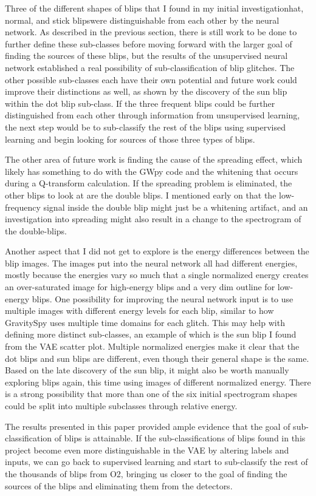 \documentclass[a4paper]{article}
\begin{document}
Three of the different shapes of blips that I found in my initial investigation\textemdash hat, normal, and stick blips\textemdash were distinguishable from each other by the neural network. As described in the previous section, there is still work to be done to further define these sub-classes before moving forward with the larger goal of finding the sources of these blips, but the results of the unsupervised neural network established a real possibility of sub-classification of blip glitches. The other possible sub-classes each have their own potential and future work could improve their distinctions as well, as shown by the discovery of the sun blip within the dot blip sub-class. If the three frequent blips could be further distinguished from each other through information from unsupervised learning, the next step would be to sub-classify the rest of the blips using supervised learning and begin looking for sources of those three types of blips. 

The other area of future work is finding the cause of the spreading effect, which likely has something to do with the GWpy code and the whitening that occurs during a Q-transform calculation. If the spreading problem is eliminated, the other blips to look at are the double blips. I mentioned early on that the low-frequency signal inside the double blip might just be a whitening artifact, and an investigation into spreading might also result in a change to the spectrogram of the double-blips.

Another aspect that I did not get to explore is the energy differences between the blip images. The images put into the neural network all had different energies, mostly because the energies vary so much that a single normalized energy creates an over-saturated image for high-energy blips and a very dim outline for low-energy blips. One possibility for improving the neural network input is to use multiple images with different energy levels for each blip, similar to how GravitySpy uses multiple time domains for each glitch. This may help with defining more distinct sub-classes, an example of which is the sun blip I found from the VAE scatter plot. Multiple normalized energies make it clear that the dot blips and sun blips are different, even though their general shape is the same. Based on the late discovery of the sun blip, it might also be worth manually exploring blips again, this time using images of different normalized energy. There is a strong possibility that more than one of the six initial spectrogram shapes could be split into multiple subclasses through relative energy. 

The results presented in this paper provided ample evidence that the goal of sub-classification of blips is attainable. If the sub-classifications of blips found in this project become even more distinguishable in the VAE by altering labels and inputs, we can go back to supervised learning and start to sub-classify the rest of the thousands of blips from O2, bringing us closer to the goal of finding the sources of the blips and eliminating them from the detectors. 



\end{document}
